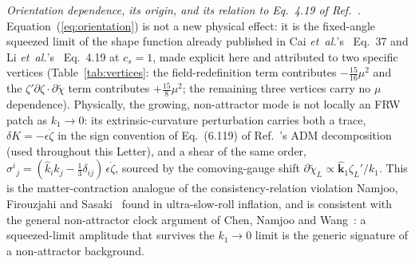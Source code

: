 \documentclass[aps,prd,reprint,superscriptaddress,showpacs,preprintnumbers,nofootinbib,longbibliography,floatfix]{revtex4-2}
\newcommand{\etal}{\textit{et~al.}}
\begin{document}
\textit{Orientation dependence, its origin, and its relation to Eq.~4.19 of
Ref.~\cite{Li:2016}.} Equation~(\ref{eq:orientation}) is not a new physical effect: it is
the fixed-angle squeezed limit of the shape function already published in Cai
\etal's~\cite{Cai:2009fn} Eq.~37 and Li \etal's~\cite{Li:2016} Eq.~4.19 at $c_s=1$, made
explicit here and attributed to two specific vertices (Table~\ref{tab:vertices}: the
field-redefinition term contributes $-\tfrac{15}{16}\mu^2$ and the
$\zeta'\partial\zeta\!\cdot\!\partial\tilde\chi$ term contributes $+\tfrac{15}{8}\mu^2$;
the remaining three vertices carry no $\mu$ dependence). Physically, the growing,
non-attractor mode is not locally an FRW patch as $k_1\to0$: its extrinsic-curvature
perturbation carries both a trace, $\delta K=-\epsilon\dot\zeta$ in the sign convention
of Eq.~(6.119) of Ref.~\cite{Maldacena:2002vr}'s ADM decomposition (used throughout this
Letter), and a shear of the same order, $\sigma^i{}_j=(\hat k_i\hat k_j-\tfrac13\delta_{ij})\,
\epsilon\dot\zeta$, sourced by the comoving-gauge shift $\partial\tilde\chi_L\propto
\hat{\mathbf k}_1\zeta_L'/k_1$. This is the matter-contraction analogue of the
consistency-relation violation Namjoo, Firouzjahi and Sasaki~\cite{Namjoo:2012} found in
ultra-slow-roll inflation, and is consistent with the general non-attractor clock
argument of Chen, Namjoo and Wang~\cite{Chen:2013aj}: a squeezed-limit amplitude that
survives the $k_1\to0$ limit is the generic signature of a non-attractor background.
\end{document}
